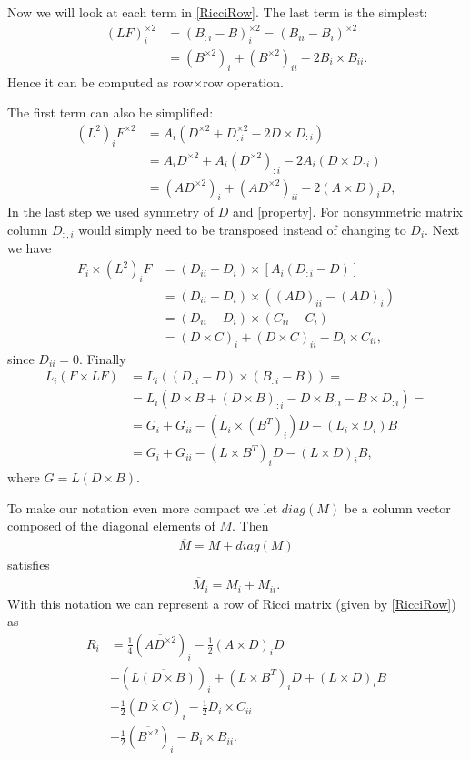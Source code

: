 \documentclass[12pt]{amsart}
\begin{document}
Now we will look at each term in \eqref{RicciRow}. The last term is the simplest:
\begin{align*}
    (LF)^{\times2}_i&=(B_{:i}-B)^{\times2}_i=(B_{ii}-B_i)^{\times2}
    \\&=
    (B^{\times2})_i+(B^{\times2})_{ii}-2B_i\times B_{ii}.
\end{align*}
Hence it can be computed as row$\times$row operation.

    The first term can also be simplified:
    \begin{align*}
	(L^2)_i F^{\times2} &= A_i(D^{\times2}+D^{\times2}_{:i}-2D\times D_{:i})
			\\&=
			A_iD^{\times2}+A_i(D^{\times2})_{:i} -2 A_i (D\times D_{:i})
			\\&=
			(A D^{\times2})_i+(A D^{\times2})_{ii} -2 (A\times D)_iD,
    \end{align*}
    In the last step we used symmetry of $D$ and \eqref{property}. For nonsymmetric matrix column $D_{:,i}$ would simply need to be transposed instead of changing to $D_i$. 
    Next we have
    \begin{align*}
	F_i\times (L^2)_iF &= (D_{ii}-D_i)\times [A_i (D_{:i}-D)] 
	\\&=
	(D_{ii}-D_i)\times ((AD)_{ii}-(AD)_i)
	\\&=
	(D_{ii}-D_i)\times (C_{ii}-C_i)
	\\&=
	(D\times C)_i + (D\times C)_{ii} - D_i\times C_{ii},
    \end{align*}
    since $D_{ii}=0$.
    Finally
    \begin{align*}
	L_i(F\times LF)&=L_i((D_{:i}-D) \times (B_{:i}-B)) =
	\\&=
	L_i\left(D\times B+(D\times B)_{:i}-D\times B_{:i}-B\times D_{:i}\right)=
	\\&=
	G_i+G_{ii}-(L_i\times (B^T)_i)D-(L_i\times D_i)B
	\\&=
	G_i+G_{ii}-(L\times B^T)_{i}D-(L\times D)_iB,
    \end{align*}
    where $G=L(D\times B)$. 

    To make our notation even more compact we let $diag(M)$ be a column vector composed of the diagonal elements of $M$. Then
    \begin{align*}
	\overline M = M + diag(M)
    \end{align*}
satisfies 
\begin{align*}
\overline M_i = M_i+M_{ii}.
\end{align*}
With this notation we can represent a row of Ricci matrix (given by \eqref{RicciRow}) as
\begin{align*}
    R_i &= \frac{1}{4}\left( \overline{AD^{\times2}} \right)_i -  \frac{1}{2}(A\times D)_i D 
    \\&
    -\left( \overline{L(D\times B)} \right)_i +(L\times B^T)_iD +(L\times D)_i B
    \\&
    + \frac{1}{2}\left(  \overline{D\times C}\right)_i - \frac{1}{2}D_i\times C_{ii}
    \\&
    + \frac{1}{2}\left(\overline{ B^{\times2}}\right)_i - B_i\times B_{ii}.
\end{align*}
\end{document}
